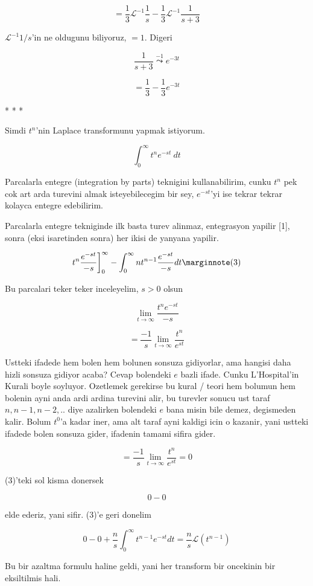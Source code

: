 \documentclass[12pt,fleqn]{article}\usepackage{../common}
\begin{document}
\[ = \frac{1}{3} \mathcal{L}^{-1}\frac{1}{s}  - 
\frac{1}{3} \mathcal{L}^{-1}\frac{1}{s+3}  
\]

$\mathcal{L}^{-1}1/s$'in ne oldugunu biliyoruz, $=1$. Digeri

\[ \frac{1}{s+3} \stackrel{-1}{\leadsto} e^{-3t} \]

\[ =  
\frac{1}{3} - \frac{1}{3} e^{-3t}
\]

* * * 

Simdi $t^n$'nin Laplace transformunu yapmak istiyorum. 

\[ \int_0^{\infty} t^ne^{-st} \ dt \]

Parcalarla entegre (integration by parts) teknigini kullanabilirim, cunku
$t^n$ pek cok art arda turevini almak isteyebilecegim bir sey, $e^{-st}$'yi
ise tekrar tekrar kolayca entegre edebilirim. 

Parcalarla entegre tekniginde ilk basta turev alinmaz, entegrasyon yapilir [1],
sonra (eksi isaretinden sonra) her ikisi de yanyana yapilir. 

\[ t^n \frac{e^{-st}}{-s} \bigg]_{0}^{\infty}  - 
\int_{0}^{\infty} nt^{n-1} \frac{e^{-st}}{-s} dt
\mlabel{3}
\] 

Bu parcalari teker teker inceleyelim, $s>0$ olsun

\[ \lim_{t \to \infty} \frac{t^n  e^{-st}}{-s}\] 

\[ = \frac{-1}{s}\lim_{t \to \infty} \frac{t^n}{ e^{st}}\] 

Ustteki ifadede hem bolen hem bolunen sonsuza gidiyorlar, ama hangisi daha
hizli sonsuza gidiyor acaba? Cevap bolendeki $e$ bazli ifade. Cunku
L'Hospital'in Kurali boyle soyluyor. Ozetlemek gerekirse bu kural / teori
hem bolumun hem bolenin ayni anda ardi ardina turevini alir, bu turevler
sonucu ust taraf $n,n-1,n-2,..$ diye azalirken bolendeki $e$ bana misin
bile demez, degismeden kalir. Bolum $t^0$'a kadar iner, ama alt taraf ayni
kaldigi icin o kazanir, yani ustteki ifadede bolen sonsuza gider, ifadenin
tamami sifira gider. 

\[ = \frac{-1}{s}\lim_{t \to \infty} \frac{t^n}{ e^{st}} = 0\] 

(3)'teki sol kisma donersek 

\[ 0 - 0  \]

elde ederiz, yani sifir. (3)'e geri donelim

\[ 0 - 0   +
\frac{n}{s} \int_{0}^{\infty} t^{n-1} e^{-st} dt = 
\frac{n}{s} \mathcal{L} (t^{n-1})
\]

Bu bir azaltma formulu haline geldi, yani her transform bir oncekinin bir
eksiltilmis hali. 
\end{document}
